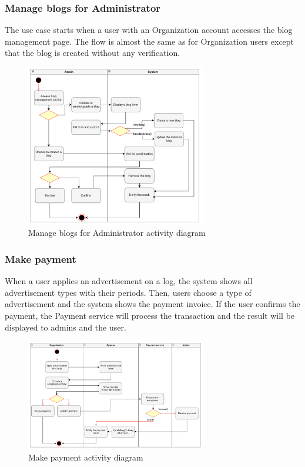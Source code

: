 \subsubsection{Manage blogs for Administrator}

The use case starts when a user with an Organization account accesses the blog management page. The flow is almost the same as for Organization users except that the blog is created without any verification.

\begin {figure}[H]
\centering
\includegraphics[width=0.7\textwidth]{Figures/manage_blog_admin.png}
\caption{Manage blogs for Administrator activity diagram}
\label{fig:manage-blog-admin}
\end{figure}

\subsubsection{Make payment}

When a user applies an advertisement on a log, the system shows all advertisement types with their periods. Then, users choose a type of advertisement and the system shows the payment invoice. If the user confirms the payment, the Payment service will process the transaction and the result will be displayed to admins and the user.

\begin {figure}[H]
\centering
\includegraphics[width=0.7\textwidth]{Figures/payment.png}
\caption{Make payment activity diagram}
\label{fig:make-payment}
\end{figure}

